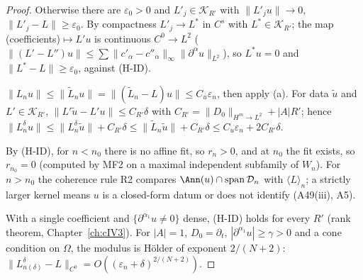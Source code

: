 \begin{proof}
Otherwise there are $\varepsilon_0>0$ and $L'_j\in\mathcal K_{R'}$ with $\|L'_ju\|\to0$, $\|L'_j-L\|\ge\varepsilon_0$. By compactness $L'_j\to L^*$ in $C^s$ with $L^*\in\mathcal K_{R'}$; the map (coefficients)$\mapsto L'u$ is continuous $C^0\to L^2$ ($\|(L'-L'')u\|\le\sum\|c'_\alpha-c''_\alpha\|_\infty\|\partial^\alpha u\|_{L^2}$), so $L^*u=0$ and $\|L^*-L\|\ge\varepsilon_0$, against (H-ID).

$\|L_nu\|\le\|\tilde L_nu\|=\|(\tilde L_n-L)u\|\le C_u\varepsilon_n$, then apply (a). For data $\tilde u$ and $L'\in\mathcal K_{R'}$, $\|L'\tilde u-L'u\|\le C_{R'}\delta$ with $C_{R'}=\|D_0\|_{H^m\to L^2}+|A|R'$; hence $\|L_n^\delta u\|\le\|L_n^\delta\tilde u\|+C_{R'}\delta\le\|\tilde L_n\tilde u\|+C_{R'}\delta\le C_u\varepsilon_n+2C_{R'}\delta$.

By (H-ID), for $n<n_0$ there is no affine fit, so $r_n>0$, and at $n_0$ the fit exists, so $r_{n_0}=0$ (computed by MF2 on a maximal independent subfamily of $W_n$). For $n>n_0$ the coherence rule R2 compares $\Ann(u)\cap\mathrm{span}\,\mathcal D_n$ with $\langle L\rangle_n$; a strictly larger kernel means $u$ is a closed-form datum or does not identify (A49(iii), A5).

With a single coefficient and $\{\partial^{\alpha_1}u\ne0\}$ dense, (H-ID) holds for every $R'$ (rank theorem, Chapter~\ref{ch:cIV3}). For $|A|=1$, $D_0=\partial_t$, $|\partial^{\alpha_1}u|\ge\gamma>0$ and a cone condition on $\Omega$, the modulus is H\"older of exponent $2/(N+2)$: $\|L^\delta_{n(\delta)}-L\|_{C^0}=O((\varepsilon_n+\delta)^{2/(N+2)})$.

\end{proof}
